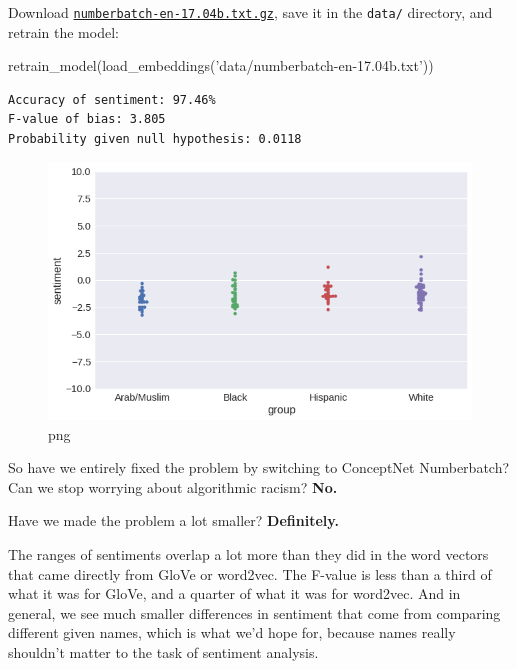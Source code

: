 \documentclass[]{book}
\newenvironment{Shaded}{\begin{snugshade}}{\end{snugshade}}
\newcommand{\StringTok}[1]{\textcolor[rgb]{0.31,0.60,0.02}{#1}}
\newcommand{\NormalTok}[1]{#1}
\theoremstyle{definition}
\theoremstyle{definition}
\theoremstyle{definition}
\theoremstyle{remark}
\begin{document}
Download
\href{http://conceptnet.s3.amazonaws.com/downloads/2017/numberbatch/numberbatch-en-17.04b.txt.gz}{\texttt{numberbatch-en-17.04b.txt.gz}},
save it in the \texttt{data/} directory, and retrain the model:

\begin{Shaded}
\begin{Highlighting}[]
\NormalTok{retrain_model(load_embeddings(}\StringTok{'data/numberbatch-en-17.04b.txt'}\NormalTok{))}
\end{Highlighting}
\end{Shaded}

\begin{verbatim}
Accuracy of sentiment: 97.46%
F-value of bias: 3.805
Probability given null hypothesis: 0.0118
\end{verbatim}

\begin{figure}
\centering
\includegraphics{how-to-make-a-racist-ai-without-really-trying_files/how-to-make-a-racist-ai-without-really-trying_64_1.png}
\caption{png}
\end{figure}

So have we entirely fixed the problem by switching to ConceptNet
Numberbatch? Can we stop worrying about algorithmic racism? \textbf{No.}

Have we made the problem a lot smaller? \textbf{Definitely.}

The ranges of sentiments overlap a lot more than they did in the word
vectors that came directly from GloVe or word2vec. The F-value is less
than a third of what it was for GloVe, and a quarter of what it was for
word2vec. And in general, we see much smaller differences in sentiment
that come from comparing different given names, which is what we'd hope
for, because names really shouldn't matter to the task of sentiment
analysis.
\end{document}
